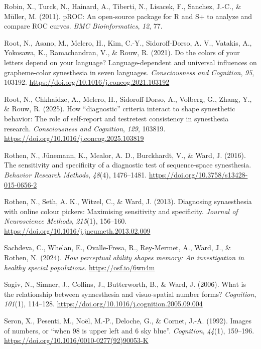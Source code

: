 \documentclass[
  man,
  longtable,
  a4paper,
  nolmodern,
  notxfonts,
  notimes,
  colorlinks=true,linkcolor=blue,citecolor=blue,urlcolor=blue]{apa7}
\newlength{\cslhangindent}
\newenvironment{CSLReferences}[2] %
 {\begin{list}{}{%
  \setlength{\itemindent}{0pt}
  \setlength{\leftmargin}{0pt}
  \setlength{\parsep}{0pt}
  \ifodd #1
   \setlength{\leftmargin}{\cslhangindent}
   \setlength{\itemindent}{-1\cslhangindent}
  \fi
  \setlength{\itemsep}{#2\baselineskip}}}
 {\end{list}}
\begin{document}
\begin{CSLReferences}{1}{0}
Robin, X., Turck, N., Hainard, A., Tiberti, N., Lisacek, F., Sanchez,
J.-C., \& Müller, M. (2011). {pROC}: An open-source package for {R} and
{S}+ to analyze and compare ROC curves. \emph{BMC Bioinformatics},
\emph{12}, 77.

Root, N., Asano, M., Melero, H., Kim, C.-Y., Sidoroff-Dorso, A. V.,
Vatakis, A., Yokosawa, K., Ramachandran, V., \& Rouw, R. (2021). Do the
colors of your letters depend on your language? Language-dependent and
universal influences on grapheme-color synesthesia in seven languages.
\emph{Consciousness and Cognition}, \emph{95}, 103192.
\url{https://doi.org/10.1016/j.concog.2021.103192}

Root, N., Chkhaidze, A., Melero, H., Sidoroff-Dorso, A., Volberg, G.,
Zhang, Y., \& Rouw, R. (2025). How {``}diagnostic{''} criteria interact
to shape synesthetic behavior: The role of self-report and
test{\textendash}retest consistency in synesthesia research.
\emph{Consciousness and Cognition}, \emph{129}, 103819.
\url{https://doi.org/10.1016/j.concog.2025.103819}

Rothen, N., Jünemann, K., Mealor, A. D., Burckhardt, V., \& Ward, J.
(2016). The sensitivity and specificity of a diagnostic test of
sequence-space synesthesia. \emph{Behavior Research Methods},
\emph{48}(4), 1476--1481.
\url{https://doi.org/10.3758/s13428-015-0656-2}

Rothen, N., Seth, A. K., Witzel, C., \& Ward, J. (2013). Diagnosing
synaesthesia with online colour pickers: Maximising sensitivity and
specificity. \emph{Journal of Neuroscience Methods}, \emph{215}(1),
156--160. \url{https://doi.org/10.1016/j.jneumeth.2013.02.009}

Sachdeva, C., Whelan, E., Ovalle-Fresa, R., Rey-Mermet, A., Ward, J., \&
Rothen, N. (2024). \emph{How perceptual ability shapes memory: An
investigation in healthy special populations}.
\url{https://osf.io/6wn4m}

Sagiv, N., Simner, J., Collins, J., Butterworth, B., \& Ward, J. (2006).
What is the relationship between synaesthesia and visuo-spatial number
forms? \emph{Cognition}, \emph{101}(1), 114--128.
\url{https://doi.org/10.1016/j.cognition.2005.09.004}

Seron, X., Pesenti, M., Noël, M.-P., Deloche, G., \& Cornet, J.-A.
(1992). Images of numbers, or {``}when 98 is upper left and 6 sky
blue{''}. \emph{Cognition}, \emph{44}(1), 159--196.
\url{https://doi.org/10.1016/0010-0277(92)90053-K}


\end{CSLReferences}
\end{document}
